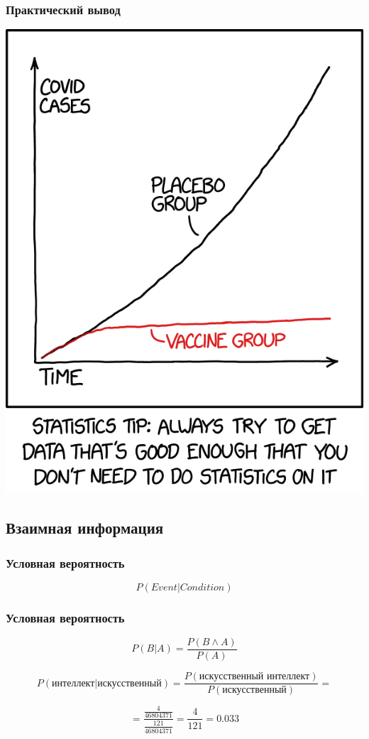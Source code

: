 \documentclass[svgnames]{beamer}
\begin{document}
\begin{frame}[standout]
  \frametitle{Практический вывод}
  \includegraphics[height=.8\textheight]{statistics_2x.png}
\end{frame}

\subsection{Взаимная информация}

\begin{frame}
  \frametitle{Условная вероятность}
$$
    P(Event|Condition)
$$
\end{frame}

\begin{frame}
  \frametitle{Условная вероятность}
  \begin{equation}
    P(B|A) = \frac{P(B \land A)}{P(A)}
  \end{equation}

  $$
    P(\text{интеллект}|\text{искусственный}) =
    \frac{P(\text{искусственный интеллект})}{P(\text{искусственный})}
    =$$

    $$
    = \frac{\frac{4}{46804371}}{\frac{121}{46804371}} = \frac{4}{121} = 0.033$$
\end{frame}
\end{document}
